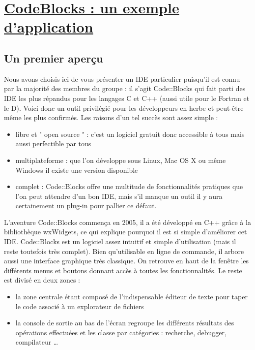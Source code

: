 \documentclass[a4paper, 12pt]{article}
\begin{document}
\newpage \section{\underline{CodeBlocks : un exemple d'application}}

\begin{onehalfspacing}
\subsection{Un premier aperçu} 
	Nous avons choisis ici de vous présenter un IDE particulier puisqu'il est connu par la majorité des membres du groupe : il s'agit Code::Blocks qui fait parti des IDE les plus répandus pour les langages C et C++ (aussi utile pour le Fortran et le D). Voici donc un outil privilégié pour les développeurs en herbe et peut-être même les plus confirmés. Les raisons d'un tel succès sont assez simple :
\begin{itemize}
\item libre et " open source " : c'est un logiciel gratuit donc accessible à tous mais aussi perfectible par tous
\item multiplateforme : que l'on développe sous Linux, Mac OS X ou même Windows il existe une version disponible
\item complet : Code::Blocks offre une multitude de fonctionnalités pratiques que l'on peut attendre d'un bon IDE, mais s'il manque un outil il y aura certainement un plug-in pour pallier ce défaut.
\end{itemize}
	L'aventure Code::Blocks commença en 2005, il a été développé en C++ grâce à la bibliothèque wxWidgets, ce qui explique pourquoi il est si simple d'améliorer cet IDE. Code::Blocks est un logiciel assez intuitif et simple d'utilisation (mais il reste toutefois très complet). Bien qu'utilisable en ligne de commande, il arbore aussi une interface graphique très classique. On retrouve en haut de la fenêtre les différents menus et boutons donnant accès à toutes les fonctionnalités.  Le reste est divisé en deux zones : \begin{itemize}
\item la zone centrale étant composé de l'indispensable éditeur de texte pour taper le code associé à un explorateur de fichiers
\item la console de sortie au bas de l'écran regroupe les différents résultats des opérations effectuées et les classe par catégories : recherche, debugger, compilateur …
\end{itemize}


\end{onehalfspacing}
\end{document}
